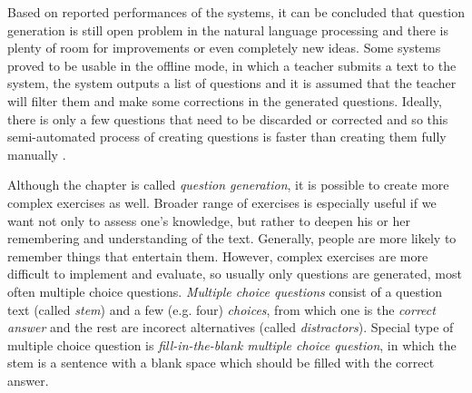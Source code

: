 \documentclass[12pt, twoside]{fithesis2}		%
\renewcommand{\_}{\leavevmode \kern0.07em\vbox{\hrule width0.4em}}
\newcounter{choice}
\begin{document}
Based on reported performances of the systems, it can be concluded that question generation is still open problem in the natural language processing and there is plenty of room for improvements or even completely new ideas.
Some systems proved to be usable in the offline mode, in which a teacher submits a text to the system,
the system outputs a list of questions and it is assumed that the teacher will filter them and make some corrections in the generated questions. Ideally, there is only a few questions that need to be discarded or corrected and so this semi-automated process of creating questions is faster than creating them fully manually
\cite{question-gen-mitkov}.

Although the chapter is called \textit{question generation},
it is possible to create more complex exercises as well.
Broader range of exercises is especially useful if we want not only to assess one's knowledge, but rather to deepen his or her remembering and understanding of the text.
Generally, people are more likely to remember things that entertain them.
However, complex exercises are more difficult to implement and evaluate,
so usually only questions are generated, most often multiple choice questions.
\textit{Multiple choice questions} consist of a question text (called \textit{stem})
and a few (e.g. four) \textit{choices}, from which one is the \textit{correct answer}
and the rest are incorect alternatives (called \textit{distractors}).
Special type of multiple choice question is \textit{fill-in-the-blank multiple choice question},
in which the stem is a sentence with a blank space which should be filled with the correct answer.
\end{document}
